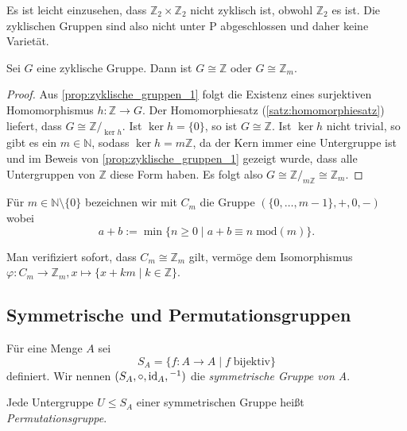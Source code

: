 \begin{remark}
    Es ist leicht einzusehen, dass $\mathbb{Z}_2 \times \mathbb{Z}_2$ nicht zyklisch ist, obwohl $\mathbb{Z}_2$ es ist. Die zyklischen Gruppen sind also nicht unter P abgeschlossen und daher keine Varietät.
\end{remark}

\begin{proposition}
    Sei $G$ eine zyklische Gruppe. Dann ist $G \cong \mathbb{Z}$ oder $G \cong \mathbb{Z}_m$.
\end{proposition}
\begin{proof}
    Aus \cref{prop:zyklische_gruppen_1} folgt die Existenz eines surjektiven Homomorphismus $h: \mathbb{Z} \to G$. Der Homomorphiesatz (\ref{satz:homomorphiesatz}) liefert, dass $G \cong \mathbb{Z}/_{\ker h}$. Ist $\ker h = \{0\}$, so ist $G \cong \mathbb{Z}$. Ist $\ker h$ nicht trivial, so gibt es ein $m \in \mathbb{N}$, sodass $\ker h = m\mathbb{Z}$, da der Kern immer eine Untergruppe ist und im Beweis von \cref{prop:zyklische_gruppen_1} gezeigt wurde, dass alle Untergruppen von $\mathbb{Z}$ diese Form haben. Es folgt also $G \cong \mathbb{Z}/_{m\mathbb{Z}} \cong \mathbb{Z}_m$.
\end{proof}

\begin{definition}
    Für $m\in\mathbb{N}\setminus\{0\}$ bezeichnen wir mit $C_m$ die Gruppe $(\{0,\ldots,m-1\},+,0,-)$ wobei
    $$a+b:=\min\{n\geq 0\mid a+b\equiv n \;\mathrm{mod}(m)\}.$$
\end{definition}

Man verifiziert sofort, dass $C_m\cong\mathbb{Z}_m$ gilt, vermöge dem Isomorphismus $\varphi:C_m\to\mathbb{Z}_m,x\mapsto\{x+km\mid k\in\mathbb{Z}\}$.

\subsection{Symmetrische und Permutationsgruppen}

\begin{definition}
    Für eine Menge $A$ sei
    $$ S_A = \{f: A \to A \mid f \;\text{bijektiv}\}$$
    definiert. Wir nennen $(S_A, \circ, \operatorname{id}_A, {}^{-1})$ die \emph{symmetrische Gruppe von A}.

    Jede Untergruppe $U \le S_A$ einer symmetrischen Gruppe heißt \emph{Permutationsgruppe}.
\end{definition}

